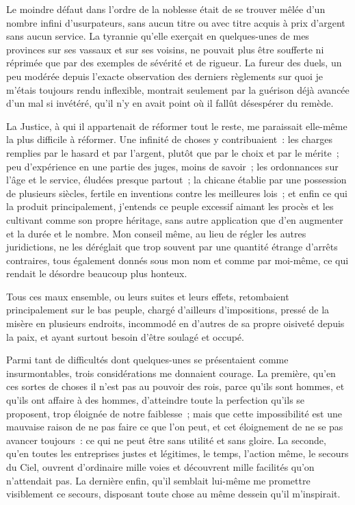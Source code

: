 \documentclass[french,twoside]{book} %
\begin{document}
Le moindre défaut dans l’ordre de la noblesse était de se trouver mêlée d’un nombre infini d’usurpateurs, sans aucun titre ou avec titre acquis à prix d’argent sans aucun service. La tyrannie qu’elle exerçait en quelques-unes de mes provinces sur ses vassaux et sur ses voisins, ne pouvait plus être soufferte ni réprimée que par des exemples de sévérité et de rigueur. La fureur des duels, un peu modérée depuis l’exacte observation des derniers règlements sur quoi je m’étais toujours rendu inflexible, montrait seulement par la guérison déjà avancée d’un mal si invétéré, qu’il n’y en avait point où il fallût désespérer du remède.\par
La Justice, à qui il appartenait de réformer tout le reste, me paraissait elle-même la plus difficile à réformer. Une infinité de choses y contribuaient : les charges remplies par le hasard et par l’argent, plutôt que par le choix et par le mérite ; peu d’expérience en une partie des juges, moins de savoir ; les ordonnances sur l’âge et le service, éludées presque partout ; la chicane établie par une possession de plusieurs siècles, fertile en inventions contre les meilleures lois ; et enfin ce qui la produit principalement, j’entends ce peuple excessif aimant les procès et les cultivant comme son propre héritage, sans autre application que d’en augmenter et la durée et le nombre. Mon conseil même, au lieu de régler les autres juridictions, ne les déréglait que trop souvent par une quantité étrange d’arrêts contraires, tous également donnés sous mon nom et comme par moi-même, ce qui rendait le désordre beaucoup plus honteux.\par
Tous ces maux ensemble, ou leurs suites et leurs effets, retombaient principalement sur le bas peuple, chargé d’ailleurs d’impositions, pressé de la misère en plusieurs endroits, incommodé en d’autres de sa propre oisiveté depuis la paix, et ayant surtout besoin d’être soulagé et occupé.\par
Parmi tant de difficultés dont quelques-unes se présentaient comme insurmontables, trois considérations me donnaient courage. La première, qu’en ces sortes de choses il n’est pas au pouvoir des rois, parce qu’ils sont hommes, et qu’ils ont affaire à des hommes, d’atteindre toute la perfection qu’ils se proposent, trop éloignée de notre faiblesse ; mais que cette impossibilité est une mauvaise raison de ne pas faire ce que l’on peut, et cet éloignement de ne se pas avancer toujours : ce qui ne peut être sans utilité et sans gloire. La seconde, qu’en toutes les entreprises justes et légitimes, le temps, l’action même, le secours du Ciel, ouvrent d’ordinaire mille voies et découvrent mille facilités qu’on n’attendait pas. La dernière enfin, qu’il semblait lui-même me promettre visiblement ce secours, disposant toute chose au même dessein qu’il m’inspirait.\par
\end{document}
